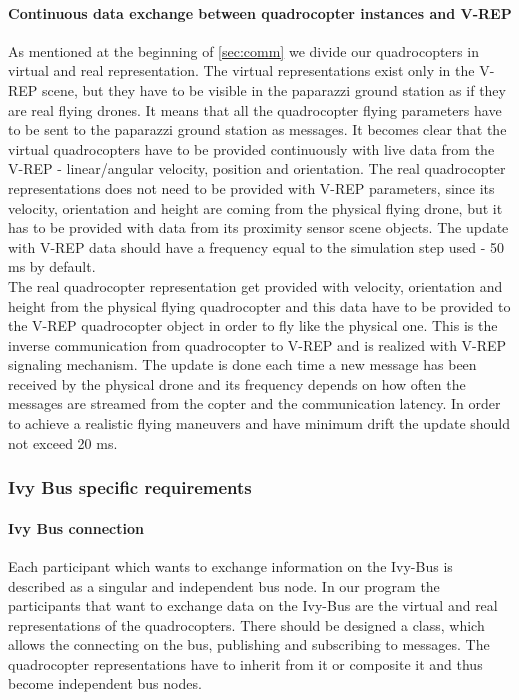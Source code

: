 \paragraph{Continuous data exchange between quadrocopter instances and V-REP}

As mentioned at the beginning of \ref{sec:comm} we divide our quadrocopters in virtual and real representation. The virtual representations exist only in the V-REP scene, but they have to be visible in the paparazzi ground station as if they are real flying drones. It means that all the quadrocopter flying parameters have to be sent to the paparazzi ground station as messages. It becomes clear that the virtual quadrocopters have to be provided continuously with live data from the V-REP - linear/angular velocity, position and orientation. The real quadrocopter representations does not need to be provided with V-REP parameters, since its velocity, orientation and height are coming from the physical flying drone, but it has to be provided with data from its proximity sensor scene objects. The update with V-REP data should have a frequency equal to the simulation step used - 50 ms by default.\\
The real quadrocopter representation get provided with velocity, orientation and height from the physical flying quadrocopter and this data have to be provided to the V-REP quadrocopter object in order to fly like the physical one. This is the inverse communication from quadrocopter to V-REP and is realized with V-REP signaling mechanism. The update is done each time a new message has been received by the physical drone and its frequency depends on how often the messages are streamed from the copter and the communication latency. In order to achieve a realistic flying maneuvers and have minimum drift the update should not exceed 20 ms.

\subsubsection{Ivy Bus specific requirements}
\label{sec:requirementsIVYBus}
\paragraph{Ivy Bus connection}
Each participant which wants to exchange information on the Ivy-Bus is described as a singular and independent bus node. In our program the participants that want to exchange data on the Ivy-Bus are the virtual and real representations of the quadrocopters. There should be designed a class, which allows the connecting on the bus, publishing and subscribing to messages. The quadrocopter representations have to inherit from it or composite it and thus become independent bus nodes.

